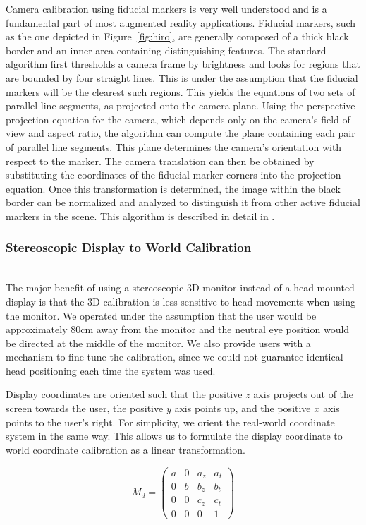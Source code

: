 \documentclass[pageno]{jpaper}
\begin{document}
Camera calibration using fiducial markers is very well understood and is a fundamental part of most augmented reality applications. Fiducial
markers, such as the one depicted in Figure~\ref{fig:hiro}, are generally composed of a thick black border and an inner area
containing distinguishing features. The standard algorithm first thresholds a camera frame by brightness and looks for regions that are bounded by four straight lines.
This is under the assumption that the fiducial markers will be the clearest such regions.
This yields the equations of two sets of parallel line segments, as projected onto the camera plane. Using the perspective projection equation
for the camera, which depends only on the camera's field of view and aspect ratio, the algorithm can compute the plane containing each pair of
parallel line segments. This plane determines the camera's orientation with respect to the marker. The camera translation can then be
obtained by substituting the coordinates of the fiducial marker corners into the projection equation. Once this transformation is determined, the image within
the black border can be normalized and analyzed to distinguish it from other active fiducial markers in the scene. This algorithm is described in
detail in \cite{kato1999marker}.
\subsubsection{Stereoscopic Display to World Calibration}$ $\\
The major benefit of using a stereoscopic 3D monitor instead of a head-mounted display is that the 3D calibration is less sensitive to
head movements when using the monitor. We operated under the assumption that the user would be approximately 80cm away from the monitor
and the neutral eye position would be directed at the middle of the monitor. We also provide users with a mechanism to fine tune the
calibration, since we could not guarantee identical head positioning each time the system was used.

Display coordinates are oriented such that the positive $z$ axis projects out of the screen towards the user, the positive $y$ axis points up, and the positive $x$ axis points to the user's right.
For simplicity, we orient the real-world coordinate system in the same way. This allows us to formulate the display coordinate to world coordinate calibration as a linear transformation.

$$M_{d} = \left(
\begin{array}{cccc}
a & 0 & a_z & a_t \\
0 & b & b_z & b_t \\
0 & 0 & c_z & c_t \\
0 & 0 &   0 &   1
\end{array}\right)$$
\end{document}
